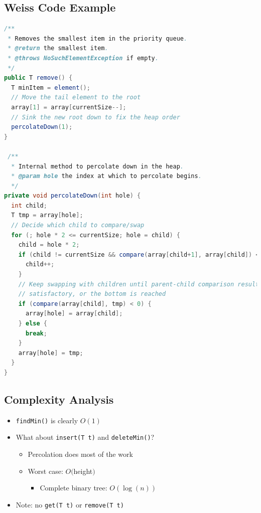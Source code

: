 \documentclass[
  10pt,
  english,
  letterpaper,
,tablecaptionabove
]{scrartcl}
\newcommand{\passthrough}[1]{#1}
\providecommand{\tightlist}{%
  \setlength{\itemsep}{0pt}\setlength{\parskip}{0pt}}
\begin{document}
\hypertarget{weiss-code-example}{%
\subsection{Weiss Code Example}\label{weiss-code-example}}

\begin{lstlisting}[language=Java]
/**
 * Removes the smallest item in the priority queue.
 * @return the smallest item.
 * @throws NoSuchElementException if empty.
 */
public T remove() {
  T minItem = element();
  // Move the tail element to the root
  array[1] = array[currentSize--];
  // Sink the new root down to fix the heap order
  percolateDown(1);
}

 /**
  * Internal method to percolate down in the heap.
  * @param hole the index at which to percolate begins.
  */
private void percolateDown(int hole) {
  int child;
  T tmp = array[hole];
  // Decide which child to compare/swap
  for (; hole * 2 <= currentSize; hole = child) {
    child = hole * 2;
    if (child != currentSize && compare(array[child+1], array[child]) < 0) {
      child++;
    }
    // Keep swapping with children until parent-child comparison result is 
    // satisfactory, or the bottom is reached
    if (compare(array[child], tmp) < 0) {
      array[hole] = array[child];
    } else {
      break;
    }
    array[hole] = tmp;
  }
}
\end{lstlisting}

\hypertarget{complexity-analysis}{%
\subsection{Complexity Analysis}\label{complexity-analysis}}

\begin{itemize}
\tightlist
\item
  \passthrough{\lstinline!findMin()!} is clearly \(O(1)\)
\item
  What about \passthrough{\lstinline!insert(T t)!} and
  \passthrough{\lstinline!deleteMin()!}?

  \begin{itemize}
  \tightlist
  \item
    Percolation does most of the work
  \item
    Worst case: \(O(\)height\()\)

    \begin{itemize}
    \tightlist
    \item
      Complete binary tree: \(O(\log(n))\)
    \end{itemize}
  \end{itemize}
\item
  Note: no \passthrough{\lstinline!get(T t)!} or
  \passthrough{\lstinline!remove(T t)!}
\end{itemize}
\end{document}
